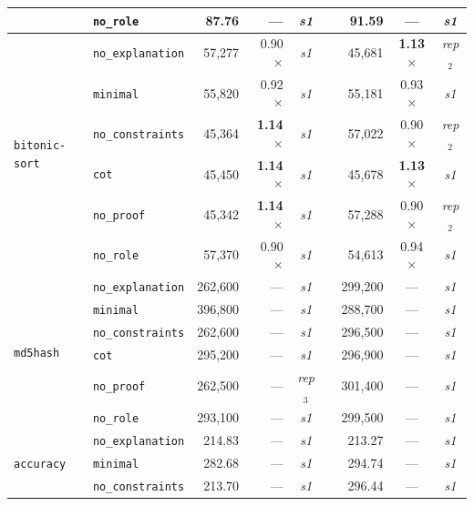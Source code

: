 \begin{table}[t]
{\begin{tabular}{@{}llrrcrrcc@{}}
  & \texttt{no\_role}        &  87.76 & --- & \textit{s1}       &&  91.59 & --- & \textit{s1}      \\
\midrule
\multirow{6}{*}{\texttt{bitonic-sort}}
  & \texttt{no\_explanation} & 57{,}277 & 0.90$\times$          & \textit{s1} && 45{,}681 & \textbf{1.13}$\times$ & \textit{rep}$_2$ \\
  & \texttt{minimal}         & 55{,}820 & 0.92$\times$          & \textit{s1} && 55{,}181 & 0.93$\times$          & \textit{s1}      \\
  & \texttt{no\_constraints} & 45{,}364 & \textbf{1.14}$\times$ & \textit{s1} && 57{,}022 & 0.90$\times$          & \textit{rep}$_2$ \\
  & \texttt{cot}             & 45{,}450 & \textbf{1.14}$\times$ & \textit{s1} && 45{,}678 & \textbf{1.13}$\times$ & \textit{s1}      \\
  & \texttt{no\_proof}       & 45{,}342 & \textbf{1.14}$\times$ & \textit{s1} && 57{,}288 & 0.90$\times$          & \textit{rep}$_2$ \\
  & \texttt{no\_role}        & 57{,}370 & 0.90$\times$          & \textit{s1} && 54{,}613 & 0.94$\times$          & \textit{s1}      \\
\midrule
\multirow{6}{*}{\texttt{md5hash}}
  & \texttt{no\_explanation} & 262{,}600 & --- & \textit{s1}      && 299{,}200 & --- & \textit{s1}      \\
  & \texttt{minimal}         & 396{,}800 & --- & \textit{s1}      && 288{,}700 & --- & \textit{s1}      \\
  & \texttt{no\_constraints} & 262{,}600 & --- & \textit{s1}      && 296{,}500 & --- & \textit{s1}      \\
  & \texttt{cot}             & 295{,}200 & --- & \textit{s1}      && 296{,}900 & --- & \textit{s1}      \\
  & \texttt{no\_proof}       & 262{,}500 & --- & \textit{rep}$_3$ && 301{,}400 & --- & \textit{s1}      \\
  & \texttt{no\_role}        & 293{,}100 & --- & \textit{s1}      && 299{,}500 & --- & \textit{s1}      \\
\midrule
\multirow{6}{*}{\texttt{accuracy}}
  & \texttt{no\_explanation} & 214.83 & --- & \textit{s1}       && 213.27 & --- & \textit{s1}      \\
  & \texttt{minimal}         & 282.68 & --- & \textit{s1}       && 294.74 & --- & \textit{s1}      \\
  & \texttt{no\_constraints} & 213.70 & --- & \textit{s1}       && 296.44 & --- & \textit{s1}      \\

\end{tabular}}
\end{table}
